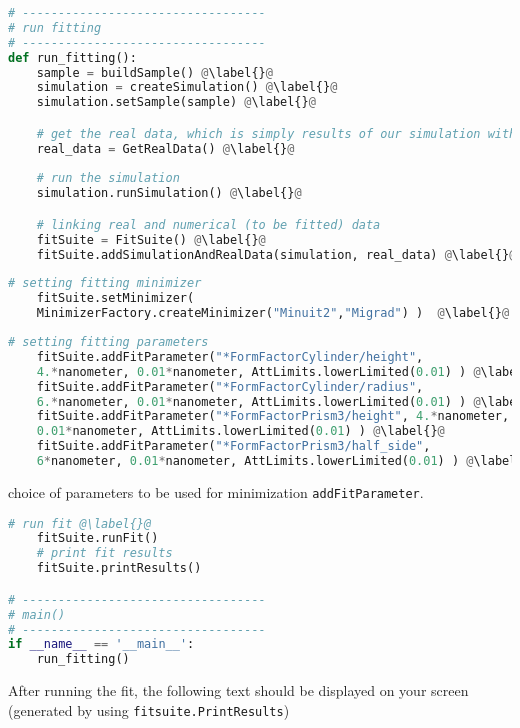 \begin{lstlisting}[language=python, style=eclipseboxed,
  name=exfit,nolol]
# ----------------------------------
# run fitting  
# ----------------------------------
def run_fitting():
    sample = buildSample() @\label{}@
    simulation = createSimulation() @\label{}@
    simulation.setSample(sample) @\label{}@

    # get the real data, which is simply results of our simulation with default values
    real_data = GetRealData() @\label{}@
    
    # run the simulation
    simulation.runSimulation() @\label{}@

    # linking real and numerical (to be fitted) data
    fitSuite = FitSuite() @\label{}@
    fitSuite.addSimulationAndRealData(simulation, real_data) @\label{}@
\end{lstlisting}


\begin{lstlisting}[language=python, style=eclipseboxed,
  name=exfit,nolol]
    # setting fitting minimizer
    fitSuite.setMinimizer(
    MinimizerFactory.createMinimizer("Minuit2","Migrad") )  @\label{}@
\end{lstlisting}



\begin{lstlisting}[language=python, style=eclipseboxed,
  name=exfit,nolol]
    # setting fitting parameters
    fitSuite.addFitParameter("*FormFactorCylinder/height",
    4.*nanometer, 0.01*nanometer, AttLimits.lowerLimited(0.01) ) @\label{}@
    fitSuite.addFitParameter("*FormFactorCylinder/radius",
    6.*nanometer, 0.01*nanometer, AttLimits.lowerLimited(0.01) ) @\label{}@
    fitSuite.addFitParameter("*FormFactorPrism3/height", 4.*nanometer,
    0.01*nanometer, AttLimits.lowerLimited(0.01) ) @\label{}@
    fitSuite.addFitParameter("*FormFactorPrism3/half_side",
    6*nanometer, 0.01*nanometer, AttLimits.lowerLimited(0.01) ) @\label{}@
\end{lstlisting}

choice of parameters
  to be used for minimization \texttt{addFitParameter}. 


\begin{lstlisting}[language=python, style=eclipseboxed, name=exfit,nolol]
    # run fit @\label{}@
    fitSuite.runFit()    
    # print fit results
    fitSuite.printResults()

# ----------------------------------
# main()
# ----------------------------------
if __name__ == '__main__':
    run_fitting()
\end{lstlisting}
After running the fit, the following text should be displayed on your
screen (generated by using \texttt{fitsuite.PrintResults})

